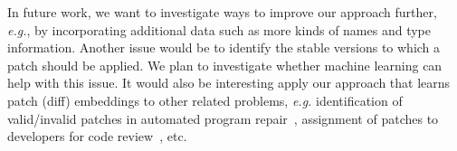 In future work, we want to investigate ways to improve
our approach further, {\em e.g.}, by incorporating additional data such as
more kinds of names and type information.  Another issue would be to
identify the stable versions to which a patch should be applied. We plan to
investigate whether machine learning can help with this issue.  It would
also be interesting apply our approach that learns patch (diff) embeddings
to other related problems, {\em e.g.} identification of valid/invalid patches in
automated program repair~\cite{xiong2018identifying}, assignment of patches
to developers for code review~\cite{thongtanunam2015should,
zanjani2016automatically}, etc.
